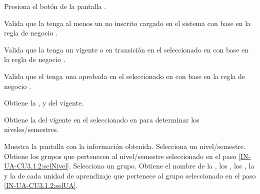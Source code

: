 \begin{UCtrayectoria}	
	\UCpaso[\UCactor]  \label{IN-UA-CU3.1.2:solocitarInscribir}Presiona el botón  de la pantalla .
	
	\UCpaso Valida que la  tenga al menos un  no inscrito cargado en el sistema con base en la regla de negocio .
	
	\UCpaso Valida que la  tenga un  vigente o en transición en el  seleccionado en  con base en la regla de negocio .
	
	\UCpaso Valida que el  tenga una  aprobada en el  seleccionado en  con base en la regla de negocio .
	
	\UCpaso Obtiene la ,  y  del  vigente.
	
	\UCpaso Obtiene la  del  vigente en el  seleccionado en  para determinar los niveles/semestres.
	
	\UCpaso Muestra la pantalla  con la información obtenida.
	\UCpaso[\UCactor]  \label{IN-UA-CU3.1.2:selNivel}Selecciona un nivel/semestre.
	\UCpaso Obtiene los grupos que pertenecen al nivel/semestre seleccionado en el paso \ref{IN-UA-CU3.1.2:selNivel}.
	\UCpaso[\UCactor]  \label{IN-UA-CU3.1.2:selGrupo}Selecciona un grupo.
	\UCpaso  \label{IN-UA-CU3.1.2:obtenerUA}Obtiene el nombre de la , los , los , la  y la  de cada unidad de aprendizaje que pertenece al grupo seleccionado en el paso \ref{IN-UA-CU3.1.2:selUA}.
	

\end{UCtrayectoria}
